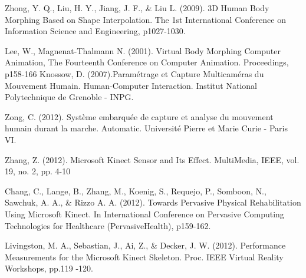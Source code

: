 \begin{thebibliography}{10}
 	Zhong, Y. Q., Liu, H. Y., Jiang, J. F., \& Liu L. (2009). 3D Human Body Morphing Based on Shape Interpolation.
 	The 1st International Conference on Information Science and Engineering, p1027-1030. 
 	
 	Lee, W., Magnenat-Thalmann N. (2001). Virtual Body Morphing
 	Computer Animation, The Fourteenth Conference on Computer Animation. Proceedings, p158-166 
 	Knossow, D. (2007).Paramétrage et Capture Multicaméras du Mouvement Humain. 
 	Human-Computer Interaction. Institut National Polytechnique de Grenoble - INPG.
 	
 	Zong, C. (2012). Système embarquée de capture et analyse du mouvement humain durant la marche.
  	Automatic. Université Pierre et Marie Curie - Paris VI.
  	
  	Zhang, Z. (2012). Microsoft Kinect
  	Sensor and Its Effect. MultiMedia, IEEE, vol. 19, no. 2, pp. 4-10
 	
 	Chang, C., Lange, B., Zhang, M., Koenig, S., Requejo, P., Somboon, N.,
 	Sawchuk, A. A., \& Rizzo A. A. (2012). Towards Pervasive Physical Rehabilitation Using
 	Microsoft Kinect. In International Conference on Pervasive Computing Technologies for Healthcare (PervasiveHealth), p159-162.
 	
  	Livingston, M. A., Sebastian, J., Ai, Z., \& Decker, J.  W. (2012). Performance Measurements for the Microsoft Kinect Skeleton. Proc. IEEE Virtual Reality Workshops,  pp.119 -120.
  	
\end{thebibliography}

